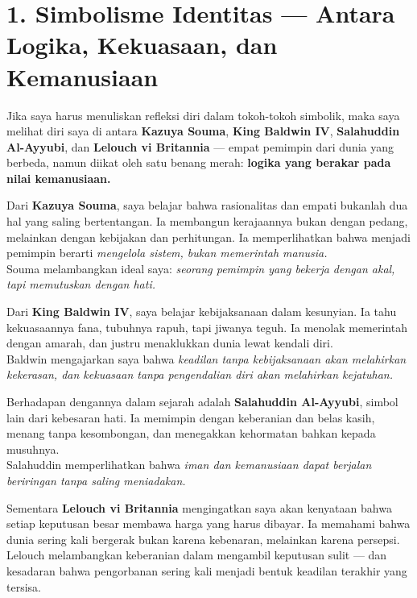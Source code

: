 \documentclass[
  letterpaper,
  DIV=11,
  numbers=noendperiod]{scrreprt}
\begin{document}
\section{\texorpdfstring{\textbf{1. Simbolisme Identitas --- Antara
Logika, Kekuasaan, dan
Kemanusiaan}}{1. Simbolisme Identitas --- Antara Logika, Kekuasaan, dan Kemanusiaan}}\label{simbolisme-identitas-antara-logika-kekuasaan-dan-kemanusiaan}

Jika saya harus menuliskan refleksi diri dalam tokoh-tokoh simbolik,
maka saya melihat diri saya di antara \textbf{Kazuya Souma},
\textbf{King Baldwin IV}, \textbf{Salahuddin Al-Ayyubi}, dan
\textbf{Lelouch vi Britannia} --- empat pemimpin dari dunia yang
berbeda, namun diikat oleh satu benang merah: \textbf{logika yang
berakar pada nilai kemanusiaan.}

Dari \textbf{Kazuya Souma}, saya belajar bahwa rasionalitas dan empati
bukanlah dua hal yang saling bertentangan. Ia membangun kerajaannya
bukan dengan pedang, melainkan dengan kebijakan dan perhitungan. Ia
memperlihatkan bahwa menjadi pemimpin berarti \emph{mengelola sistem,
bukan memerintah manusia.}\\
Souma melambangkan ideal saya: \emph{seorang pemimpin yang bekerja
dengan akal, tapi memutuskan dengan hati.}

Dari \textbf{King Baldwin IV}, saya belajar kebijaksanaan dalam
kesunyian. Ia tahu kekuasaannya fana, tubuhnya rapuh, tapi jiwanya
teguh. Ia menolak memerintah dengan amarah, dan justru menaklukkan dunia
lewat kendali diri.\\
Baldwin mengajarkan saya bahwa \emph{keadilan tanpa kebijaksanaan akan
melahirkan kekerasan, dan kekuasaan tanpa pengendalian diri akan
melahirkan kejatuhan.}

Berhadapan dengannya dalam sejarah adalah \textbf{Salahuddin Al-Ayyubi},
simbol lain dari kebesaran hati. Ia memimpin dengan keberanian dan belas
kasih, menang tanpa kesombongan, dan menegakkan kehormatan bahkan kepada
musuhnya.\\
Salahuddin memperlihatkan bahwa \emph{iman dan kemanusiaan dapat
berjalan beriringan tanpa saling meniadakan.}

Sementara \textbf{Lelouch vi Britannia} mengingatkan saya akan kenyataan
bahwa setiap keputusan besar membawa harga yang harus dibayar. Ia
memahami bahwa dunia sering kali bergerak bukan karena kebenaran,
melainkan karena persepsi.\\
Lelouch melambangkan keberanian dalam mengambil keputusan sulit --- dan
kesadaran bahwa pengorbanan sering kali menjadi bentuk keadilan terakhir
yang tersisa.
\end{document}
